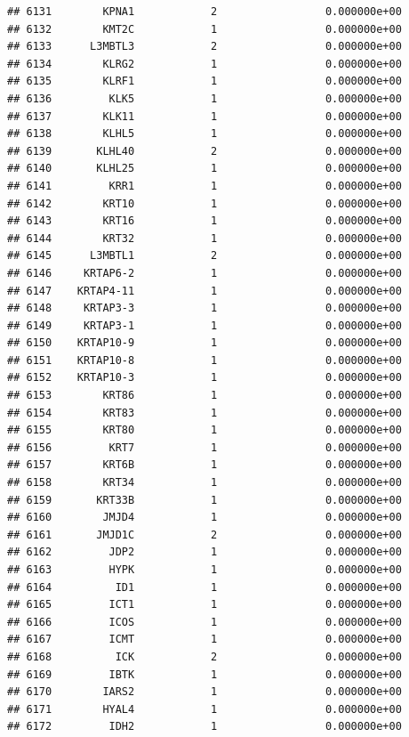 \documentclass[
]{article}
\begin{document}
\begin{verbatim}
## 6131        KPNA1            2                 0.000000e+00
## 6132        KMT2C            1                 0.000000e+00
## 6133      L3MBTL3            2                 0.000000e+00
## 6134        KLRG2            1                 0.000000e+00
## 6135        KLRF1            1                 0.000000e+00
## 6136         KLK5            1                 0.000000e+00
## 6137        KLK11            1                 0.000000e+00
## 6138        KLHL5            1                 0.000000e+00
## 6139       KLHL40            2                 0.000000e+00
## 6140       KLHL25            1                 0.000000e+00
## 6141         KRR1            1                 0.000000e+00
## 6142        KRT10            1                 0.000000e+00
## 6143        KRT16            1                 0.000000e+00
## 6144        KRT32            1                 0.000000e+00
## 6145      L3MBTL1            2                 0.000000e+00
## 6146     KRTAP6-2            1                 0.000000e+00
## 6147    KRTAP4-11            1                 0.000000e+00
## 6148     KRTAP3-3            1                 0.000000e+00
## 6149     KRTAP3-1            1                 0.000000e+00
## 6150    KRTAP10-9            1                 0.000000e+00
## 6151    KRTAP10-8            1                 0.000000e+00
## 6152    KRTAP10-3            1                 0.000000e+00
## 6153        KRT86            1                 0.000000e+00
## 6154        KRT83            1                 0.000000e+00
## 6155        KRT80            1                 0.000000e+00
## 6156         KRT7            1                 0.000000e+00
## 6157        KRT6B            1                 0.000000e+00
## 6158        KRT34            1                 0.000000e+00
## 6159       KRT33B            1                 0.000000e+00
## 6160        JMJD4            1                 0.000000e+00
## 6161       JMJD1C            2                 0.000000e+00
## 6162         JDP2            1                 0.000000e+00
## 6163         HYPK            1                 0.000000e+00
## 6164          ID1            1                 0.000000e+00
## 6165         ICT1            1                 0.000000e+00
## 6166         ICOS            1                 0.000000e+00
## 6167         ICMT            1                 0.000000e+00
## 6168          ICK            2                 0.000000e+00
## 6169         IBTK            1                 0.000000e+00
## 6170        IARS2            1                 0.000000e+00
## 6171        HYAL4            1                 0.000000e+00
## 6172         IDH2            1                 0.000000e+00

\end{verbatim}
\end{document}
